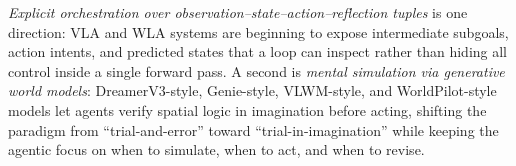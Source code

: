 \emph{Explicit orchestration over observation--state--action--reflection tuples} is one direction: VLA and WLA systems are beginning to expose intermediate subgoals, action intents, and predicted states that a loop can inspect rather than hiding all control inside a single forward pass. A second is \emph{mental simulation via generative world models}: DreamerV3-style, Genie-style, VLWM-style, and WorldPilot-style models let agents verify spatial logic in imagination before acting, shifting the paradigm from ``trial-and-error'' toward ``trial-in-imagination'' while keeping the agentic focus on when to simulate, when to act, and when to revise.
